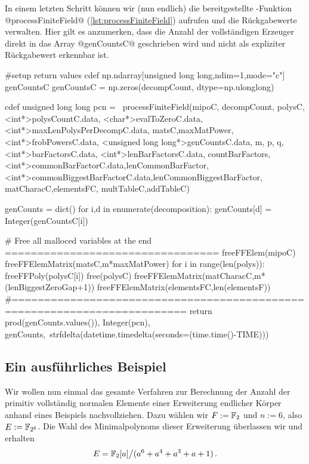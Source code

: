 In einem letzten Schritt können wir (nun endlich) die bereitgestellte
\Clang-Funktion @processFiniteField@ (\autoref{lst:processFiniteField}) 
aufrufen und die Rückgabewerte verwalten. Hier gilt es anzumerken, dass die
Anzahl der vollständigen Erzeuger direkt in das Array @genCountsC@ geschrieben
wird und nicht als expliziter Rückgabewert erkennbar ist.


\begin{sagecode}[caption={\texttt{countCompleteSubmoduleGenerators}
  Fortsetzung (IV)}]
    #setup return values
    cdef np.ndarray[unsigned long long,ndim=1,mode="c"] genCountsC
    genCountsC = np.zeros(decompCount, dtype=np.ulonglong)

    cdef unsigned long long pcn = \
            processFiniteField(mipoC, decompCount,
                    polysC,<int*>polysCountC.data,
                    <char*>evalToZeroC.data,
                    <int*>maxLenPolysPerDecompC.data,
                    matsC,maxMatPower,<int*>frobPowersC.data,
                    <unsigned long long*>genCountsC.data, m, p, q,
                    <int*>barFactorsC.data, <int*>lenBarFactorsC.data,
                    countBarFactors,
                    <int*>commonBarFactorC.data,lenCommonBarFactor,
                    <int*>commonBiggestBarFactorC.data,lenCommonBiggestBarFactor,
                    matCharacC,elementsFC,
                    multTableC,addTableC)

    genCounts = dict()
    for i,d in enumerate(decomposition):
        genCounts[d] = Integer(genCountsC[i])

    # Free all malloced variables at the end =================================
    freeFFElem(mipoC)
    freeFFElemMatrix(matsC,m*maxMatPower)
    for i in range(len(polys)):
        freeFFPoly(polysC[i])
    free(polysC)
    freeFFElemMatrix(matCharacC,m*(lenBiggestZeroGap+1))
    freeFFElemMatrix(elementsFC,len(elementsF))
    #=========================================================================
    return prod(genCounts.values()), Integer(pcn), genCounts,\
            strfdelta(datetime.timedelta(seconds=(time.time()-TIME)))
\end{sagecode}


\subsection{Ein ausführliches Beispiel}

Wir wollen nun einmal das gesamte Verfahren zur Berechnung der Anzahl 
der primitiv vollständig normalen Elemente einer Erweiterung endlicher Körper
anhand eines Beispiels nachvollziehen. Dazu wählen wir $F := \mathbb{F}_2$ und 
$n := 6$, also $E := \mathbb{F}_{2^6}$. Die Wahl des Minimalpolynoms dieser Erweiterung
überlassen wir \sage und erhalten 
\[ E = \mathbb{F}_2[a] \big/ ( a^6 + a^4 + a^3 + a + 1 ) \,.\]

